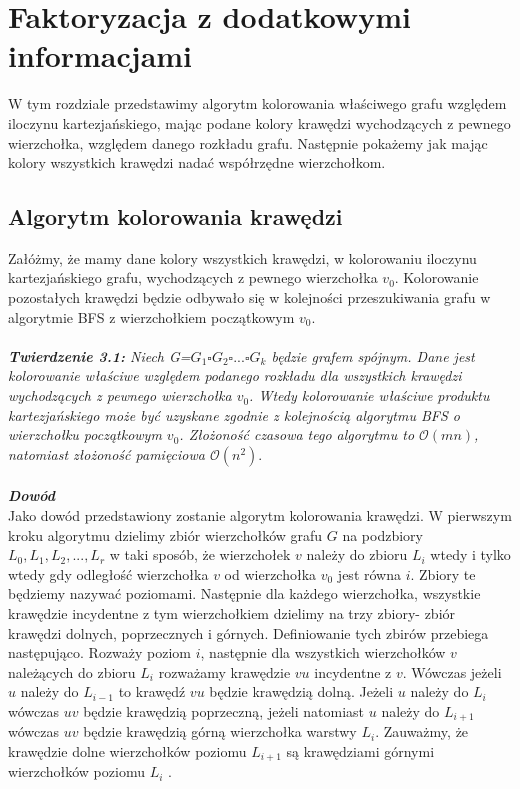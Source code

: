 \documentclass[12pt,a4paper,titlepage]{article}
\begin{document}
\section{Faktoryzacja z dodatkowymi informacjami}
W tym rozdziale przedstawimy algorytm kolorowania właściwego grafu względem iloczynu kartezjańskiego, mając podane kolory krawędzi wychodzących z pewnego wierzchołka, względem danego rozkładu grafu. Następnie pokażemy jak mając kolory wszystkich krawędzi nadać współrzędne wierzchołkom. 
\\
\subsection{Algorytm kolorowania krawędzi}
Załóżmy, że mamy dane kolory wszystkich krawędzi, w kolorowaniu iloczynu kartezjańskiego grafu, wychodzących z pewnego wierzchołka $v_0$. Kolorowanie pozostałych krawędzi będzie odbywało się w kolejności przeszukiwania grafu w algorytmie BFS z wierzchołkiem początkowym $v_0$. \\
\\
\textit{\textbf{Twierdzenie 3.1:} Niech G=$G_1 \square G_2 \square ... \square G_k$ będzie grafem spójnym. Dane jest kolorowanie właściwe względem podanego rozkładu dla wszystkich krawędzi wychodzących z pewnego wierzchołka $v_0$. Wtedy kolorowanie właściwe produktu kartezjańskiego może być uzyskane zgodnie z kolejnością algorytmu BFS o wierzchołku początkowym $v_0$. Złożoność czasowa tego algorytmu to $\mathcal{O}(mn)$, natomiast złożoność pamięciowa $\mathcal{O}(n^2)$}.\\
\\
\textit{\textbf{Dowód}}\\
Jako dowód przedstawiony zostanie algorytm kolorowania krawędzi. W pierwszym kroku algorytmu dzielimy zbiór wierzchołków grafu $G$ na podzbiory $L_0 , L_1, L_2 , ..., L_r$ w taki sposób, że wierzchołek $v$ należy do zbioru $L_i$ wtedy i tylko wtedy gdy odległość wierzchołka $v$ od wierzchołka $v_0$ jest równa $i$. Zbiory te będziemy nazywać poziomami. Następnie dla każdego wierzchołka, wszystkie krawędzie incydentne z tym wierzchołkiem dzielimy na trzy zbiory- zbiór krawędzi dolnych, poprzecznych i górnych. Definiowanie tych zbirów przebiega następująco. Rozważy poziom $i$, następnie dla wszystkich wierzchołków $v$ należących do zbioru $L_i$ rozważamy krawędzie $vu$ incydentne z $v$. Wówczas jeżeli $u$ należy do $L_{i-1}$ to krawędź $vu$ będzie krawędzią dolną. Jeżeli $u$ należy do $L_i$ wówczas $uv$ będzie krawędzią poprzeczną, jeżeli natomiast $u$ należy do $L_{i+1}$ wówczas $uv$ będzie krawędzią górną wierzchołka warstwy $L_i$. Zauważmy, że krawędzie dolne wierzchołków poziomu $L_{i+1}$ są krawędziami górnymi wierzchołków poziomu $L_{i}$ .\\
\end{document}
